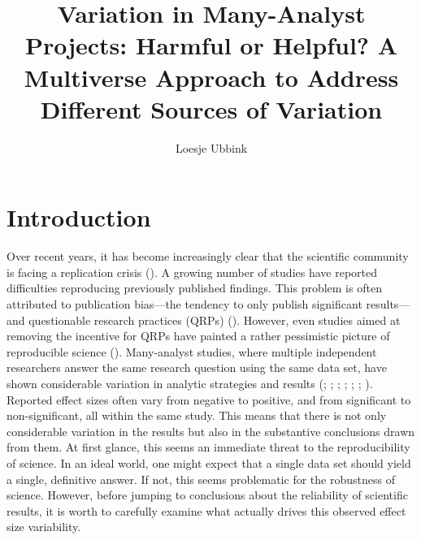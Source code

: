 \documentclass[
  man,
  floatsintext,
  longtable,
  nolmodern,
  notxfonts,
  notimes,
  colorlinks=true,linkcolor=blue,citecolor=blue,urlcolor=blue]{apa7}
\title{Variation in Many-Analyst Projects: Harmful or Helpful? A
Multiverse Approach to Address Different Sources of Variation}
\author{Loesje Ubbink}
\affiliation{
{Universiteit Utrecht}}
\newlength{\cslhangindent}
\begin{document}
\maketitle




\setlength\LTleft{0pt}



\ifdefined\Shaded\renewenvironment{Shaded}{\begin{snugshade}\begin{singlespace}}{\end{singlespace}\end{snugshade}}\fi

\setlength{\cslhangindent}{0.5in}

\section{Introduction}\label{introduction}

Over recent years, it has become increasingly clear that the scientific
community is facing a replication crisis
(). A growing
number of studies have reported difficulties reproducing previously
published findings. This problem is often attributed to publication
bias---the tendency to only publish significant results---and
questionable research practices (QRPs)
(). However, even
studies aimed at removing the incentive for QRPs have painted a rather
pessimistic picture of reproducible science
().
Many-analyst studies, where multiple independent researchers answer the
same research question using the same data set, have shown considerable
variation in analytic strategies and results
(;
; ;
;
; ; ).
Reported effect sizes often vary from negative to positive, and from
significant to non-significant, all within the same study. This means
that there is not only considerable variation in the results but also in
the substantive conclusions drawn from them. At first glance, this seems
an immediate threat to the reproducibility of science. In an ideal
world, one might expect that a single data set should yield a single,
definitive answer. If not, this seems problematic for the robustness of
science. However, before jumping to conclusions about the reliability of
scientific results, it is worth to carefully examine what actually
drives this observed effect size variability.
\end{document}

